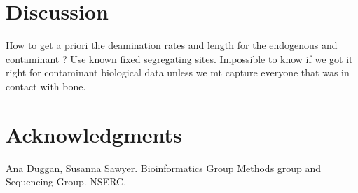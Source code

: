 \documentclass[a4paper,12pt]{article}
\begin{document}
\section{Discussion}

How to get a priori the deamination rates and length for the endogenous and contaminant ? Use known fixed segregating sites. 
Impossible to know if we got it right for contaminant biological data unless we mt capture everyone that was in contact with bone.

\section{Acknowledgments}

Ana Duggan, Susanna Sawyer. Bioinformatics Group Methods group and Sequencing Group. NSERC.

{}

\end{document}
